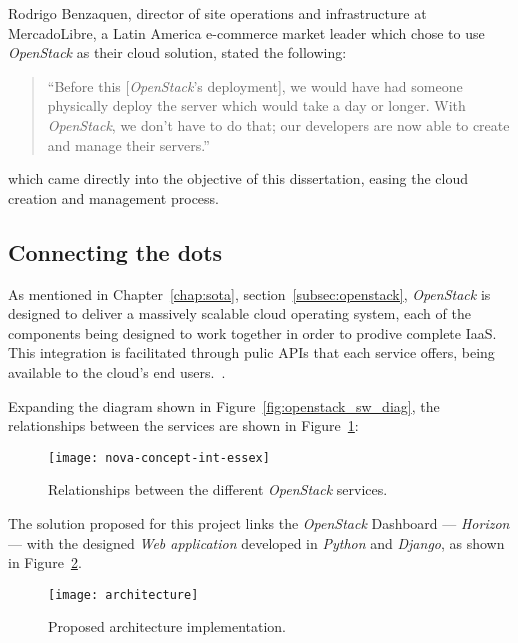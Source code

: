 Rodrigo Benzaquen, director of site operations and infrastructure at MercadoLibre, a Latin America e-commerce market leader which chose to use \textit{OpenStack} as their cloud solution, stated the following:

\begin{quote}
 ``Before this [\textit{OpenStack}'s deployment], we would have had someone physically deploy the server which would take a day or longer. With \textit{OpenStack}, we don't have to do that; our developers are now able to create and manage their servers.''\cite{openstack-userstories}
\end{quote}

which came directly into the objective of this dissertation, easing the cloud creation and management process.

\clearpage
\subsection{Connecting the dots}\label{subsec:architecture}

As mentioned in Chapter~\ref{chap:sota}, section~\ref{subsec:openstack}, \textit{OpenStack} is designed to deliver a massively scalable cloud operating system, each of the components being designed to work together in order to prodive complete IaaS. This integration is facilitated through pulic APIs that each service offers, being available to the cloud's end users.~\cite{ken-pepple:essex-arch}. 

Expanding the diagram shown in Figure~\ref{fig:openstack_sw_diag}, the relationships between the services are shown in Figure~\ref{fig:openstack_services}:

\begin{figure}[h!]
  \begin{center}
    \leavevmode
    \texttt{[image: nova-concept-int-essex]}
    \caption{Relationships between the different \textit{OpenStack} services.~\cite{ken-pepple:essex-arch}}
    \label{fig:openstack_services}
  \end{center}
\end{figure}

The solution proposed for this project links the \textit{OpenStack} Dashboard --- \textit{Horizon} --- with the designed \textit{Web application} developed in \textit{Python} and \textit{Django}, as shown in Figure~\ref{fig:architecture}.

\begin{figure}[t]
  \begin{center}
    \leavevmode
    \texttt{[image: architecture]}
    \caption{Proposed architecture implementation.}
    \label{fig:architecture}
  \end{center}
\end{figure}

